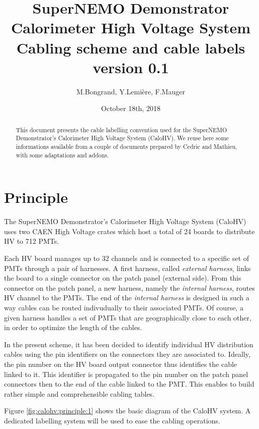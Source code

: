 \documentclass[12pt,a4paper]{article}
\title{SuperNEMO Demonstrator\\
  Calorimeter High Voltage System\\
  Cabling scheme and cable labels\\
  version 0.1}
\author{M.Bongrand, Y.Lemi\`ere, F.Mauger}
\date{October 18th, 2018}
\begin{document}
\maketitle

\begin{abstract}
  \noindent This document presents the cable labelling convention used
  for  the SuperNEMO  Demonstrator's Calorimeter  High Voltage  System
  (CaloHV).  We reuse  here some informations available  from a couple
  of documents prepared  by Cedric and Mathieu,  with some adaptations
  and addons.
\end{abstract}

\tableofcontents
\vfill

\clearpage
\section{Principle}

The SuperNEMO Demonstrator's Calorimeter  High Voltage System (CaloHV)
uses two CAEN High  Voltage crates which host a total  of 24 boards to
distribute HV to 712 PMTs.

Each HV board manages up to 32 channels and is connected to a specific
set of  PMTs through  a pair  of harnesses.   A first  harness, called
\emph{external harness}, links the board  to a single connector on the
patch panel (external side). From this connector on the patch panel, a
new harness, namely the \emph{internal  harness}, routes HV channel to
the PMTs.  The end of the  \emph{internal harness} is designed in such
a way cables can be routed  indivudually to their associated PMTs.  Of
course, a given harness handles a  set of PMTs that are geographically
close to each other, in order to optimize the length of the cables.

In the present  scheme, it has been decided to  identify individual HV
distribution cables using  the pin identifiers on  the connectors they
are associated  to.  Ideally, the  pin number  on the HV  board output
connector thus identifies the cable  linked to it.  This identifier is
propagated to the pin number on the patch panel connectors then to the
end  of the  cable linked  to the  PMT. This  enables to  build rather
simple and comprehensible cabling tables.

\noindent\par  Figure  \ref{fig:calohv:principle:1}  shows  the  basic
diagram of  the CaloHV  system. A dedicated  labelling system  will be
used to ease the cabling operations.
\end{document}
